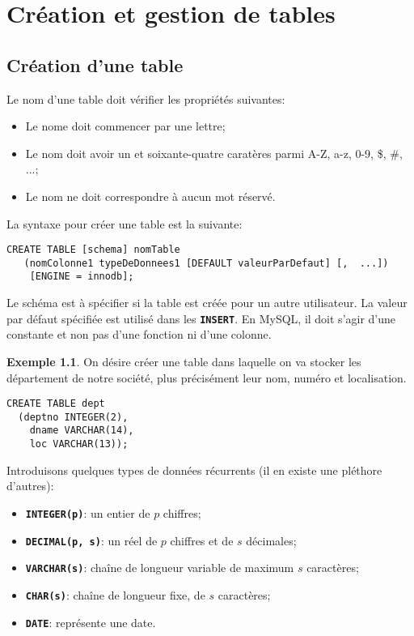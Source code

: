 \documentclass[a4paper, 12pt]{report}
\newcommand{\textSQL}[1]{\texttt{\textbf{#1}}}
\theoremstyle{definition} \newtheorem{ex}{Exemple}
\begin{document}
\chapter{Création et gestion de tables}
\section{Création d'une table}
Le nom d'une table doit vérifier les propriétés suivantes:
\begin{itemize}
  \item Le nome doit commencer par une lettre;
	\item Le nom doit avoir un et soixante-quatre caratères parmi A-Z, a-z, 0-9, \$, \#, ...;
	\item Le nom ne doit correspondre à aucun mot réservé.
\end{itemize}

La syntaxe pour créer une table est la suivante:
\begin{lstlisting}[frame=single]
CREATE TABLE [schema] nomTable
   (nomColonne1 typeDeDonnees1 [DEFAULT valeurParDefaut] [,  ...])
	[ENGINE = innodb];
\end{lstlisting}
Le schéma est à spécifier si la table est créée pour un autre utilisateur. La valeur par défaut spécifiée est utilisé dans les \textSQL{INSERT}. En MySQL, il doit s'agir d'une constante et non pas d'une fonction ni d'une colonne.

\begin{ex}
On désire créer une table dans laquelle on va stocker les département de notre société, plus précisément leur nom, numéro et localisation.
\begin{lstlisting}[frame=single]
CREATE TABLE dept
  (deptno INTEGER(2),
	dname VARCHAR(14),
	loc VARCHAR(13));
\end{lstlisting}
\end{ex}
Introduisons quelques types de données récurrents (il en existe une pléthore d'autres):
\begin{itemize}
\item \textSQL{INTEGER(p)}: un entier de $p$ chiffres;
\item \textSQL{DECIMAL(p, s)}: un réel de $p$ chiffres et de $s$ décimales;
\item \textSQL{VARCHAR(s)}: chaîne de longueur variable de maximum $s$ caractères;
\item \textSQL{CHAR(s)}: chaîne de longueur fixe, de $s$ caractères;
\item \textSQL{DATE}: représente une date.
\end{itemize}
\end{document}
